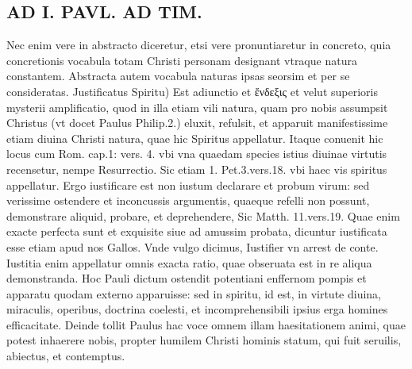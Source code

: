\documentclass{article}
\begin{document}
\begin{pages}
\section*{AD I. PAVL. AD TIM. }
\marginpar{[ p.180 ]}\pstart Nec enim vere in abstracto diceretur, etsi vere pronuntiaretur in concreto, quia concretionis vocabula totam Christi personam designant vtraque natura constantem. Abstracta autem vocabula naturas ipsas seorsim et per se consideratas.  \pend\pstart Justificatus Spiritu) Est adiunctio et ἔνδεξις et velut superioris mysterii amplificatio, quod in illa etiam vili natura, quam pro nobis assumpsit Christus (vt docet Paulus Philip.2.) eluxit, refulsit, et apparuit manifestissime etiam diuina Christi natura, quae hic Spiritus appellatur. Itaque conuenit hic locus cum Rom. cap.1: vers. 4. vbi vna quaedam species istius diuinae virtutis recensetur, nempe Resurrectio. Sic etiam 1. Pet.3.vers.18. vbi haec vis spiritus appellatur. Ergo iustificare est non iustum declarare et probum virum: sed verissime ostendere et inconcussis argumentis, quaeque refelli non possunt, demonstrare aliquid, probare, et deprehendere, Sic Matth. 11.vers.19. Quae enim exacte perfecta sunt et exquisite siue ad amussim probata, dicuntur iustificata esse etiam apud nos Gallos. Vnde vulgo dicimus, Iustifier vn arrest de conte. Iustitia enim appellatur omnis exacta ratio, quae obseruata est in re aliqua demonstranda. Hoc Pauli dictum ostendit potentiani enffernom pompis et apparatu quodam externo apparuisse: sed in spiritu, id est, in virtute diuina, miraculis, operibus, doctrina coelesti, et incomprehensibili ipsius erga homines efficacitate. Deinde tollit Paulus hac voce omnem illam haesitationem animi, quae potest inhaerere nobis, propter humilem Christi hominis statum, qui fuit seruilis, abiectus, et contemptus.  \pend

\end{pages}
\end{document}
